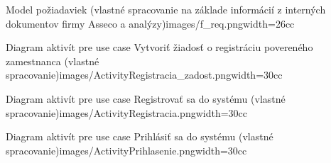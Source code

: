 \setupsectionblock[backmatter][before={\setuplist[kap][before={}]}]

\startbackmatter


\stopbackmatter

%
\startappendices


\setuplabeltext[appendix=~]


{Model požiadaviek (vlastné spracovanie na základe informácií z interných dokumentov firmy Asseco a analýzy)}{images/f_req.png}{width=26cc}


{Diagram aktivít pre use case Vytvoriť žiadosť o registráciu povereného zamestnanca (vlastné spracovanie)}{images/ActivityRegistracia_zadost.png}{width=30cc}

{Diagram aktivít pre use case Registrovať sa do systému (vlastné spracovanie)}{images/ActivityRegistracia.png}{width=30cc}

{Diagram aktivít pre use case Prihlásiť sa do systému (vlastné spracovanie)}{images/ActivityPrihlasenie.png}{width=30cc}


